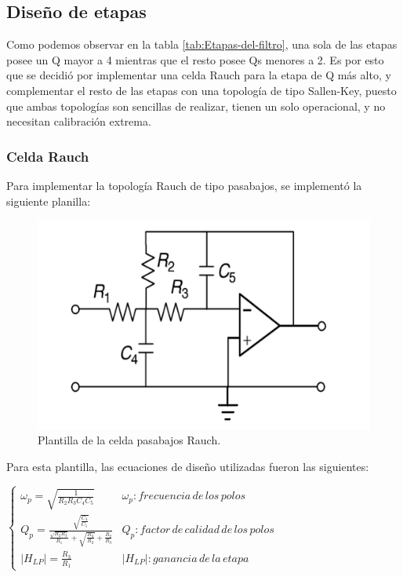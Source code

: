 \documentclass[../../ASSD_TP1_G7.tex]{subfiles}
\begin{document}
\subsection{Diseño de etapas}

Como podemos observar en la tabla \ref{tab:Etapas-del-filtro}, una
sola de las etapas posee un Q mayor a 4 mientras que el resto posee
Qs menores a 2. Es por esto que se decidió por implementar una celda
Rauch para la etapa de Q más alto, y complementar el resto de las
etapas con una topología de tipo Sallen-Key, puesto que ambas topologías
son sencillas de realizar, tienen un solo operacional, y no necesitan
calibración extrema.

\subsubsection{Celda Rauch}

Para implementar la topología Rauch de tipo pasabajos, se implementó
la siguiente planilla:
\begin{figure}[H]
\begin{centering}
\includegraphics[scale=0.6]{Imagenes/rauch.PNG}\caption{Plantilla de la celda pasabajos Rauch.}
\par\end{centering}
\end{figure}


Para esta plantilla, las ecuaciones de diseño utilizadas fueron las
siguientes:

$\begin{cases}
\omega_{p}=\sqrt{\frac{1}{R_{2}R_{3}C_{4}C_{5}}} & \omega_{p}:frecuencia\,de\,los\,polos\\
Q_{p}=\frac{\sqrt{\frac{C_{4}}{C_{5}}}}{\frac{\sqrt{R_{2}R_{3}}}{R_{1}}+\sqrt{\frac{R_{3}}{R_{2}}}+\frac{R_{2}}{R_{3}}} & Q_{p}:factor\,de\,calidad\,de\,los\,polos\\
|H_{LP}|=\frac{R_{3}}{R_{1}} & |H_{LP}|:ganancia\,de\,la\,etapa
\end{cases}$
\end{document}
